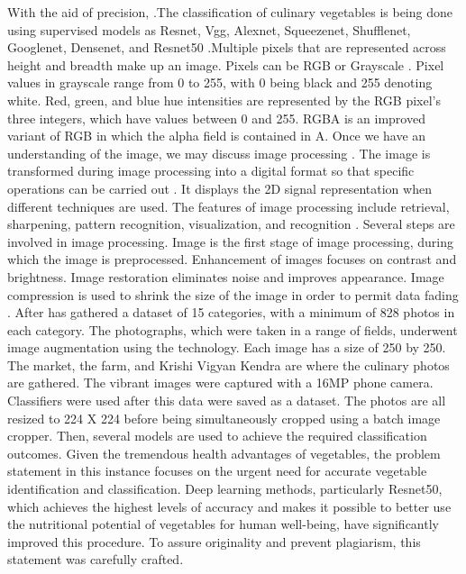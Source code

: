 \documentclass[a4paper,fleqn]{cas-sc}
\begin{document}
            With the aid of precision, \cite{agarwal2021classification}.The classification of culinary vegetables is being done using supervised models as Resnet, Vgg, Alexnet, Squeezenet, Shufflenet, Googlenet, Densenet, and Resnet50 \cite{rocha2010automatic}.Multiple pixels that are represented across height and breadth make up an image. Pixels can be RGB or Grayscale \cite{padmavathi2016implementation}. Pixel values in grayscale range from 0 to 255, with 0 being black and 255 denoting white. Red, green, and blue hue intensities are represented by the RGB pixel's three integers, which have values between 0 and 255. RGBA is an improved variant of RGB in which the alpha field is contained in A. Once we have an understanding of the image, we may discuss image processing \cite{egmont2002image}. The image is transformed during image processing into a digital format so that specific operations can be carried out \cite{salvi2021impact}. It displays the 2D signal representation when different techniques are used. The features of image processing include retrieval, sharpening, pattern recognition, visualization, and recognition \cite{behura2021cluster}.
           Several steps are involved in image processing. Image is the first stage of image processing, during which the image is preprocessed. Enhancement of images focuses on contrast and brightness. Image restoration eliminates noise and improves appearance. Image compression is used to shrink the size of the image in order to permit data fading \cite{valikhani2021machine}. After has gathered a dataset of 15 categories, with a minimum of 828 photos in each category. The photographs, which were taken in a range of fields, underwent image augmentation using the technology. Each image has a size of 250 by 250. The market, the farm, and Krishi Vigyan Kendra are where the culinary photos are gathered.  The vibrant images were captured with a 16MP phone camera. Classifiers were used after this data were saved as a dataset. The photos are all resized to 224 X 224 before being simultaneously cropped using a batch image cropper. Then, several models are used to achieve the required classification outcomes.
           Given the tremendous health advantages of vegetables, the problem statement in this instance focuses on the urgent need for accurate vegetable identification and classification. Deep learning methods, particularly Resnet50, which achieves the highest levels of accuracy and makes it possible to better use the nutritional potential of vegetables for human well-being, have significantly improved this procedure. To assure originality and prevent plagiarism, this statement was carefully crafted.
\end{document}
